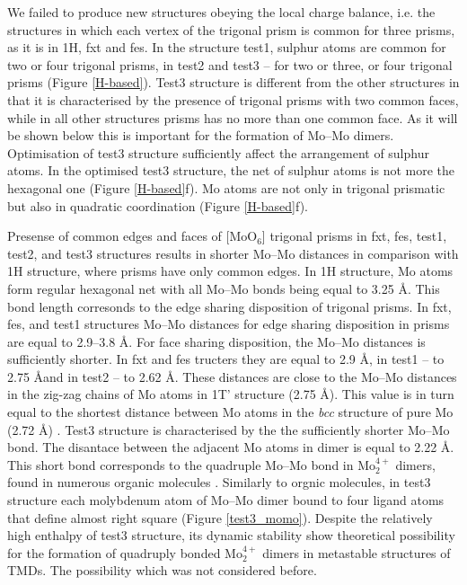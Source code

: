 \documentclass[a4paperm]{article}
\begin{document}
We failed to produce new structures obeying the local charge balance, i.e. the structures in which each vertex of the trigonal prism is common for three prisms, as it is in 1H, fxt and fes.
In the structure test1, sulphur atoms are common for two or four trigonal prisms, in test2 and test3 – for two or three, or four trigonal prisms (Figure \ref{H-based}).
Test3 structure is different from the other structures in that it is characterised by the presence of trigonal prisms with two common faces, while in all other structures prisms has no more than one common face.
As it will be shown below this is important for the formation of Mo--Mo dimers.
Optimisation of test3 structure sufficiently affect the arrangement of sulphur atoms.
In the optimised test3 structure, the net of sulphur atoms is not more the hexagonal one (Figure \ref{H-based}f).
Mo atoms are not only in trigonal prismatic but also in quadratic coordination (Figure \ref{H-based}f).


Presense of common edges and faces of [MoO$_6$] trigonal prisms in fxt, fes, test1, test2, and test3 structures results in shorter Mo--Mo distances in comparison with 1H structure, where prisms have only common edges.
In 1H structure, Mo atoms form regular hexagonal net with all Mo--Mo bonds being equal to 3.25 \AA.
This bond length corresonds to the edge sharing disposition of trigonal prisms.
In fxt, fes, and test1 structures Mo--Mo distances for edge sharing disposition in prisms are equal to 2.9--3.8 \AA.
For face sharing disposition, the Mo--Mo distances is sufficiently shorter.
In fxt and fes tructers they are equal to 2.9 \AA, in test1 -- to 2.75 \AA and in test2 -- to 2.62 \AA.
These distances are close to the Mo--Mo distances in the zig-zag chains of Mo atoms in 1T' structure (2.75 \AA).
This value is in turn equal to the shortest distance between Mo atoms in the {\it bcc} structure of pure Mo (2.72 \AA) \cite{MoV}.
Test3 structure is characterised by the the sufficiently shorter Mo--Mo bond.
The disantace between the adjacent Mo atoms in dimer is equal to 2.22 \AA.
This short bond corresponds to the quadruple Mo--Mo bond in Mo$_2^{4+}$ dimers, found in numerous organic molecules \cite{momo}.
Similarly to orgnic molecules, in test3 structure  each molybdenum atom of Mo--Mo dimer bound to four ligand atoms that define almost right square (Figure \ref{test3_momo}).
Despite the relatively high enthalpy of test3 structure, its dynamic stability show theoretical possibility for the formation of quadruply bonded Mo$_2^{4+}$ dimers in metastable structures of TMDs.
The possibility which was not considered before.
\end{document}
